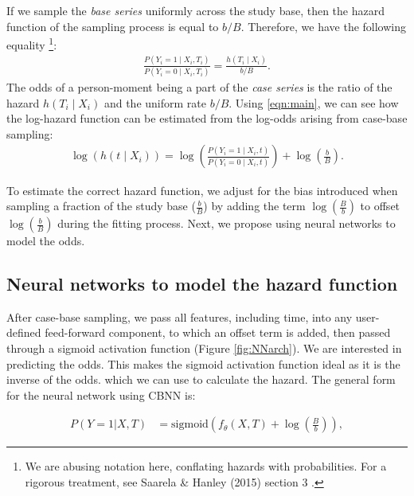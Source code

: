\documentclass[APA,LATO1COL]{WileyNJD-v2}
\begin{document}
If we sample the \emph{base series} uniformly across the study
base, then the hazard function of the sampling process is equal to
\(b/B\). Therefore, we have the following equality \cite{saarela2015}
\footnote{We are abusing notation here, conflating hazards with probabilities. For a rigorous treatment, see Saarela \& Hanley (2015) section 3 \cite{saarela2015} .}:
\begin{align}\label{eqn:main}
\frac{P\left(Y_i=1 \mid X_i, T_i\right)}{P\left(Y_i = 0 \mid X_i, T_i\right)} = \frac{h\left(T_i \mid X_i\right)}{b/B}.
\end{align} The odds of a person-moment being a part of the \emph{case
series} is the ratio of the hazard \(h(T_i \mid X_i)\) and the uniform
rate \(b/B\). Using \eqref{eqn:main}, we can see how the log-hazard
function can be estimated from the log-odds arising from case-base
sampling: \begin{align}\label{eqn:offset}
\log \left( h\left(t \mid X_i\right)\right) = \log \left(\frac{P\left(Y_i = 1 \mid X_i, t\right)}{P\left(Y_i = 0 \mid X_i, t\right)}\right) + \log\left(\frac{b}{B}\right).
\end{align}

To estimate the correct hazard function, we adjust for the bias
introduced when sampling a fraction of the study base (\(\frac{b}{B}\)) by adding
the term \(\log\left(\frac{B}{b} \right)\) to offset \(\log\left(\frac{b}{B} \right)\)
during the fitting process. Next, we propose using neural networks to model the
odds.

\hypertarget{neural-networks-to-model-the-hazard-function}{%
\subsection{Neural networks to model the hazard
function}\label{neural-networks-to-model-the-hazard-function}}

After case-base sampling, we pass all features, including time, into any
user-defined feed-forward component, to which an offset term is added,
then passed through a sigmoid activation function (Figure
\ref{fig:NNarch}). We are interested in predicting the odds. This makes the sigmoid
activation function ideal as it is the inverse of the odds. which we can use to calculate the hazard. The general form for the
neural network using CBNN is:

\begin{align*}
P\left(Y=1|X,T\right)&=\mathrm{sigmoid}\left(f_{\theta}(X, T) + \log\left(\frac{B}{b}\right) \right),
\end{align*}
\end{document}
